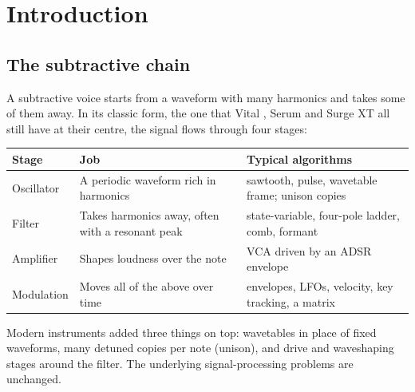 \documentclass[conference]{IEEEtran}
\begin{document}
\begin{abstract}
\begin{itemize}
\item \textbf{Wavetables:} the alias floor of a wavetable oscillator is set by its interpolation, not by its band-limiting. Quadrupling the frame size raises it by about 24 dB.
\item \textbf{Waveshapers:} 2× oversampling does more for a tanh waveshaper than first-order antiderivative antialiasing does at 1×.
\end{itemize}

The paper closes with a recommended baseline architecture and its measured cost.

\end{abstract}

\setcounter{section}{0}
\section{Introduction}
\setcounter{subsection}{0}
\subsection{The subtractive chain}
A subtractive voice starts from a waveform with many harmonics and takes some of them away. In its classic form, the one that Vital \cite{S1,S2}, Serum \cite{S3} and Surge XT \cite{S5} all still have at their centre, the signal flows through four stages:

\begin{table}[t]
\centering\footnotesize
\begin{tabularx}{\textwidth}{@{}l>{\raggedright\arraybackslash}X>{\raggedright\arraybackslash}X@{}}
\toprule
\textbf{Stage} & \textbf{Job} & \textbf{Typical algorithms} \\
\midrule
Oscillator & A periodic waveform rich in harmonics & sawtooth, pulse, wavetable frame; unison copies \\
Filter & Takes harmonics away, often with a resonant peak & state-variable, four-pole ladder, comb, formant \\
Amplifier & Shapes loudness over the note & VCA driven by an ADSR envelope \\
Modulation & Moves all of the above over time & envelopes, LFOs, velocity, key tracking, a matrix \\
\bottomrule
\end{tabularx}
\end{table}

Modern instruments added three things on top: wavetables in place of fixed waveforms, many detuned copies per note (unison), and drive and waveshaping stages around the filter. The underlying signal-processing problems are unchanged.
\end{document}
